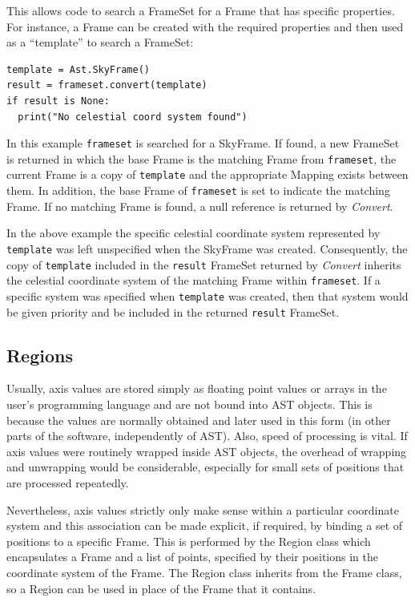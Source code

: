 \documentclass[final,authoryear,5p,times,twocolumn]{elsarticle}
\begin{document}
This allows code to search a FrameSet for a Frame that has specific
properties. For instance, a Frame can be created with the required
properties and then used as a ``template'' to search a FrameSet:

\begin{lstlisting}
template = Ast.SkyFrame()
result = frameset.convert(template)
if result is None:
  print("No celestial coord system found")
\end{lstlisting}

In this example \texttt{frameset} is searched for a SkyFrame. If found, a
new FrameSet is returned in which the base Frame is the matching Frame
from \texttt{frameset}, the current Frame is a copy of \texttt{template} and
the appropriate Mapping exists between them. In addition, the base Frame
of \texttt{frameset} is set to indicate the matching Frame. If no matching
Frame is found, a null reference is returned by \emph{Convert}.

In the above example the specific celestial coordinate system represented
by \texttt{template} was left unspecified when the SkyFrame was created.
Consequently, the copy of \texttt{template} included in the
\texttt{result} FrameSet returned by \emph{Convert} inherits the
celestial coordinate system of the matching Frame within
\texttt{frameset}. If a specific system was specified when \texttt{template}
was created, then that system would be given priority and be included in
the returned \texttt{result} FrameSet.

\subsection{Regions}
\label{sec:region}
Usually, axis values are stored simply as floating point values or arrays
in the user's programming language and are not bound into AST objects.
This is because the values are normally obtained and later used in this
form (in other parts of the software, independently of AST). Also, speed
of processing is vital. If axis values were routinely wrapped inside AST
objects, the overhead of wrapping and unwrapping would be considerable,
especially for small sets of positions that are processed repeatedly.

Nevertheless, axis values strictly only make sense within a particular
coordinate system and this association can be made explicit, if required,
by binding a set of positions to a specific Frame. This is performed by
the Region class which encapsulates a Frame and a list of points,
specified by their positions in the coordinate system of the Frame. The
Region class inherits from the Frame class, so a Region can be used in
place of the Frame that it contains.
\end{document}
